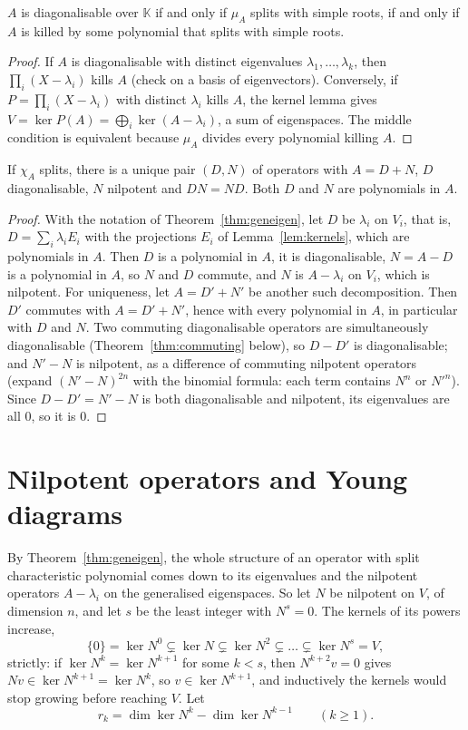 \begin{corollary}[diagonalisability]\label{cor:diag}
$A$ is diagonalisable over $\mathbb K$ if and only if $\mu_A$ splits with simple roots, if and only if $A$ is killed by some
polynomial that splits with simple roots.
\end{corollary}
\begin{proof}
If $A$ is diagonalisable with distinct eigenvalues $\lambda_1,\dots,\lambda_k$, then $\prod_i(X-\lambda_i)$ kills $A$ (check on
a basis of eigenvectors). Conversely, if $P=\prod_i(X-\lambda_i)$ with distinct $\lambda_i$ kills $A$, the kernel lemma gives
$V=\ker P(A)=\bigoplus_i\ker(A-\lambda_i)$, a sum of eigenspaces. The middle condition is equivalent because $\mu_A$ divides
every polynomial killing $A$.
\end{proof}

\begin{theorem}\label{thm:dunford}
If $\chi_A$ splits, there is a unique pair $(D,N)$ of operators with $A=D+N$, $D$ diagonalisable, $N$ nilpotent and $DN=ND$.
Both $D$ and $N$ are polynomials in $A$.
\end{theorem}
\begin{proof}
With the notation of Theorem~\ref{thm:geneigen}, let $D$ be $\lambda_i$ on $V_i$, that is, $D=\sum_i\lambda_iE_i$ with the
projections $E_i$ of Lemma~\ref{lem:kernels}, which are polynomials in $A$. Then $D$ is a polynomial in $A$, it is
diagonalisable, $N=A-D$ is a polynomial in $A$, so $N$ and $D$ commute, and $N$ is $A-\lambda_i$ on $V_i$, which is
nilpotent. For uniqueness, let $A=D'+N'$ be another such decomposition. Then $D'$ commutes with $A=D'+N'$, hence with
every polynomial in $A$, in particular with $D$ and $N$. Two commuting diagonalisable operators are simultaneously
diagonalisable (Theorem~\ref{thm:commuting} below), so $D-D'$ is diagonalisable; and $N'-N$ is nilpotent, as a difference
of commuting nilpotent operators (expand $(N'-N)^{2n}$ with the binomial formula: each term contains $N^n$ or $N'^n$).
Since $D-D'=N'-N$ is both diagonalisable and nilpotent, its eigenvalues are all $0$, so it is $0$.
\end{proof}

\section{Nilpotent operators and Young diagrams}\label{sec:nilpotent}

By Theorem~\ref{thm:geneigen}, the whole structure of an operator with split characteristic polynomial comes down to its
eigenvalues and the nilpotent operators $A-\lambda_i$ on the generalised eigenspaces. So let $N$ be nilpotent on $V$, of
dimension $n$, and let $s$ be the least integer with $N^s=0$. The kernels of its powers increase,
\[
\{0\}=\ker N^0\subsetneq\ker N\subsetneq\ker N^2\subsetneq\dots\subsetneq\ker N^s=V,
\]
strictly: if $\ker N^k=\ker N^{k+1}$ for some $k<s$, then $N^{k+2}v=0$ gives $Nv\in\ker N^{k+1}=\ker N^k$, so $v\in\ker
N^{k+1}$, and inductively the kernels would stop growing before reaching $V$. Let
\[
r_k=\dim\ker N^k-\dim\ker N^{k-1}\qquad(k\ge1).
\]

